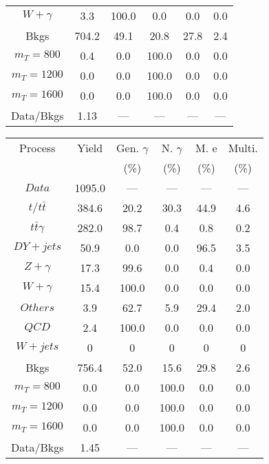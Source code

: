 \begin{figure}
\begin{minipage}[c]{0.32\textwidth}
{\begin{tabular}{cccccc}
$ W+\gamma $ &  3.3 &  100.0 &  0.0 &  0.0 &  0.0\\
Bkgs &  704.2 &  49.1 &  20.8 &  27.8 &  2.4\\
$ m_{T} = 800 $ &  0.4 &  0.0 &  100.0 &  0.0 &  0.0\\
$ m_{T} = 1200 $ &  0.0 &  0.0 &  100.0 &  0.0 &  0.0\\
$ m_{T} = 1600 $ &  0.0 &  0.0 &  100.0 &  0.0 &  0.0\\
Data/Bkgs &  1.13 &  --- &  --- &  --- &  ---\\
\hline
\end{tabular}
}
\end{minipage}
\begin{minipage}[c]{0.32\textwidth}
\centering
\tiny{
\begin{tabular}{cccccc}
\hline
Process & Yield & Gen. $\gamma$ & N. $\gamma$ & M. e & Multi. \\
 &  & (\%) & (\%) & (\%) & (\%)  \\
\hline
                                                                      $ Data $ &  1095.0 &  --- &  --- &  --- &  ---\\
$ t/t\bar{t} $ &  384.6 &  20.2 &  30.3 &  44.9 &  4.6\\
$ t\bar{t}\gamma $ &  282.0 &  98.7 &  0.4 &  0.8 &  0.2\\
$ DY+jets $ &  50.9 &  0.0 &  0.0 &  96.5 &  3.5\\
$ Z+\gamma $ &  17.3 &  99.6 &  0.0 &  0.4 &  0.0\\
$ W+\gamma $ &  15.4 &  100.0 &  0.0 &  0.0 &  0.0\\
$ Others $ &  3.9 &  62.7 &  5.9 &  29.4 &  2.0\\
$ QCD $ &  2.4 &  100.0 &  0.0 &  0.0 &  0.0\\
$ W+jets $ &  0 &  0 &  0 &  0 &  0\\
Bkgs &  756.4 &  52.0 &  15.6 &  29.8 &  2.6\\
$ m_{T} = 800 $ &  0.0 &  0.0 &  100.0 &  0.0 &  0.0\\
$ m_{T} = 1200 $ &  0.0 &  0.0 &  100.0 &  0.0 &  0.0\\
$ m_{T} = 1600 $ &  0.0 &  0.0 &  100.0 &  0.0 &  0.0\\
Data/Bkgs &  1.45 &  --- &  --- &  --- &  ---\\
\hline
\end{tabular}
}
\end{minipage}
\begin{minipage}[c]{0.32\textwidth}
\centering
\tiny{
\begin{tabular}{cccccc}

\end{tabular}}
\end{minipage}
\end{figure}
